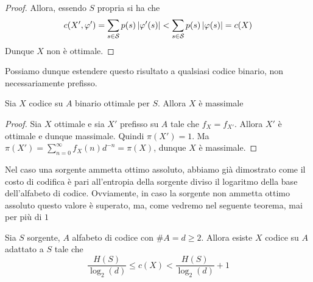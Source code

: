 \begin{proof}
  Allora, essendo \(S\) propria si ha che
  \[c(X',\varphi') = \sum_{s\in\mathcal{S}} p(s)\left|\varphi'(s)\right| < \sum_{s\in\mathcal{S}} p(s)\left|\varphi(s)\right| = c(X)\]
  Dunque \(X\) non è ottimale.
\end{proof}

Possiamo dunque estendere questo risultato a qualsiasi codice binario, non necessariamente prefisso.

\begin{corollary}[label=cor:binary-optimality-maximality]{}
  Sia \(X\) codice su \(A\) binario ottimale per \(S\). Allora \(X\) è massimale
\end{corollary}

\begin{proof}
  Sia \(X\) ottimale e sia \(X'\) prefisso su \(A\) tale che \(f_X = f_{X'}\).
  Allora \(X'\) è ottimale e dunque massimale. Quindi \(\pi(X') = 1\).
  Ma \(\pi(X') = \sum_{n=0}^{\infty} f_X(n)d^{-n} = \pi(X)\), dunque \(X\) è massimale.
\end{proof}

Nel caso una sorgente ammetta ottimo assoluto, abbiamo già dimostrato come il costo di codifica è pari all'entropia della sorgente diviso il logaritmo della base dell'alfabeto di codice.
Ovviamente, in caso la sorgente non ammetta ottimo assoluto questo valore è superato, ma, come vedremo nel seguente teorema, mai per più di \(1\)
\begin{theorem}{}
  Sia \(S\) sorgente, \(A\) alfabeto di codice con \(\#A = d \geq 2\). Allora esiste \(X\) codice su \(A\) adattato a \(S\) tale che
  \[\frac{H(S)}{\log_2(d)} \leq c(X) <\frac{H(S)}{\log_2(d)} +1\]
\end{theorem}

